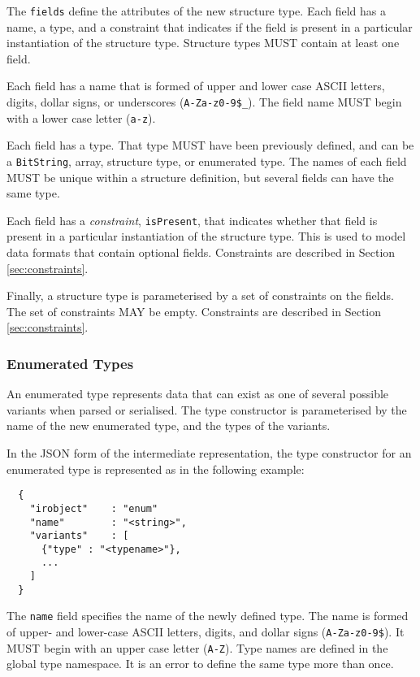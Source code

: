 \documentclass[10pt,twocolumn,a4paper]{article}
\newcommand{\code}[1]{\texttt{#1}}
\begin{document}
The \code{fields} define the attributes of the new structure type. Each
field has a name, a type, and a constraint that indicates if the field is
present in a particular instantiation of the structure type. Structure
types MUST contain at least one field.

Each field has a name that is formed of upper and lower case ASCII letters,
digits, dollar signs, or underscores (\code{A-Za-z0-9\$\_}). The field name
MUST begin with a lower case letter (\code{a-z}).

Each field has a type. That type MUST have been previously defined, and can
be a \code{BitString}, array, structure type, or enumerated type. The names
of each field MUST be unique within a structure definition, but several
fields can have the same type.

Each field has a \emph{constraint}, \code{isPresent}, that indicates
whether that field is present in a particular instantiation of the
structure type. This is used to model data formats that contain optional
fields. Constraints are described in Section \ref{sec:constraints}.

Finally, a structure type is parameterised by a set of constraints on the
fields. The set of constraints MAY be empty. Constraints are described in
Section \ref{sec:constraints}.


\subsubsection{Enumerated Types}

An enumerated type represents data that can exist as one of several possible
variants when parsed or serialised. The type constructor is parameterised by
the name of the new enumerated type, and the types of the variants.

In the JSON form of the intermediate representation, the type constructor
for an enumerated type is represented as in the following example:
\footnotesize
\begin{verbatim}
  {
    "irobject"    : "enum"
    "name"        : "<string>",
    "variants"    : [
      {"type" : "<typename>"},
      ...
    ]
  }
\end{verbatim}
\normalsize
The \code{name} field specifies the name of the newly defined type. The
name is formed of upper- and lower-case ASCII letters, digits, and dollar
signs (\code{A-Za-z0-9\$}).  It MUST begin with an upper case letter
(\code{A-Z}). Type names are defined in the global type namespace.
It is an error to define the same type more than once.
\end{document}
